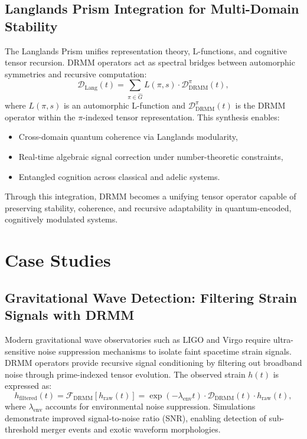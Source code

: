 \documentclass{article}
\theoremstyle{plain}
\begin{document}
\subsection{Langlands Prism Integration for Multi-Domain Stability}

The Langlands Prism unifies representation theory, L-functions, and cognitive tensor recursion. DRMM operators act as spectral bridges between automorphic symmetries and recursive computation:
\begin{equation}
\mathcal{D}_{\text{Lang}}(t) = \sum_{\pi \in \hat{G}} L(\pi, s) \cdot \mathcal{D}_{\text{DRMM}}^{\pi}(t),
\end{equation}
where $L(\pi, s)$ is an automorphic L-function and $\mathcal{D}_{\text{DRMM}}^{\pi}(t)$ is the DRMM operator within the $\pi$-indexed tensor representation. This synthesis enables:
\begin{itemize}
    \item Cross-domain quantum coherence via Langlands modularity,
    \item Real-time algebraic signal correction under number-theoretic constraints,
    \item Entangled cognition across classical and adelic systems.
\end{itemize}
Through this integration, DRMM becomes a unifying tensor operator capable of preserving stability, coherence, and recursive adaptability in quantum-encoded, cognitively modulated systems.

\section{Case Studies}

\subsection{Gravitational Wave Detection: Filtering Strain Signals with DRMM}

Modern gravitational wave observatories such as LIGO and Virgo require ultra-sensitive noise suppression mechanisms to isolate faint spacetime strain signals. DRMM operators provide recursive signal conditioning by filtering out broadband noise through prime-indexed tensor evolution. The observed strain $h(t)$ is expressed as:
\begin{equation}
h_{\text{filtered}}(t) = \mathcal{F}_{\text{DRMM}} \left[ h_{\text{raw}}(t) \right] = \exp(-\lambda_{\text{env}} t) \cdot \mathcal{D}_{\text{DRMM}}(t) \cdot h_{\text{raw}}(t),
\end{equation}
where $\lambda_{\text{env}}$ accounts for environmental noise suppression. Simulations demonstrate improved signal-to-noise ratio (SNR), enabling detection of sub-threshold merger events and exotic waveform morphologies.
\end{document}
